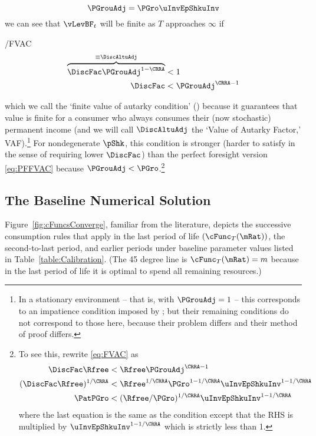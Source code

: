 \documentclass[BufferStockTheory]{subfiles}
\begin{document}
\begin{equation}
  \label{eq:PGrouAdj}
  \PGrouAdj = \PGro \uInvEpShkuInv 
\end{equation}
we can see that $\vLevBF_{t}$ will be finite 
as $T$ approaches $\infty$ if\hypertarget{FVAC}{}
\begin{verbatimwrite}{\EqDir/FVAC}
  \begin{align}
    \overbrace{\DiscFac \PGrouAdj^{1-\CRRA} }^{\equiv \DiscAltuAdj}  & < 1 \notag
    \\ \DiscFac  & < \PGrouAdj^{\CRRA-1} \label{eq:FVAC}
  \end{align}
\end{verbatimwrite}

which we call the `finite value of autarky condition' \hypertarget{FVAC}{}
(\FVAC) because it guarantees that value is finite for a consumer who always consumes their 
(now stochastic) permanent income (and we will call $\DiscAltuAdj$ the `Value of Autarky Factor,' VAF).\footnote{In a stationary environment -- that is, with $\PGrouAdj=1$ -- this corresponds to an impatience condition imposed by \cite{mstIncFluct}; but their remaining conditions do not correspond to those here, because their problem differs and their method of proof differs.}  For nondegenerate $\pShk$, this 
condition is stronger
(harder to satisfy in the sense of requiring lower $\DiscFac$) than
the perfect foresight version \eqref{eq:PFFVAC} because $\PGrouAdj <
\PGro$.\footnote{To see this, rewrite \eqref{eq:FVAC} as 
  \begin{align*}
    \DiscFac \Rfree & < \Rfree \PGrouAdj^{\CRRA-1}
    \\ (\DiscFac \Rfree)^{1/\CRRA}  & < \Rfree^{1/\CRRA} \PGro^{1-1/\CRRA} \uInvEpShkuInv^{1-1/\CRRA} 
    \\ \PatPGro & < (\Rfree/\PGro)^{1/\CRRA} \uInvEpShkuInv^{1-1/\CRRA}
  \end{align*}
  where the last equation is the same as the {\PFFVAC} condition except that the 
  RHS is multiplied by $\uInvEpShkuInv^{1-1/\CRRA}$ which is strictly less than 1.}


\hypertarget{Baseline-Numerical-Solution}{}
\subsection{The Baseline Numerical Solution}

Figure~\ref{fig:cFuncsConverge}, familiar from the literature, depicts the successive consumption
rules that apply in the last period of life $(\cFunc_{T}(\mRat))$, the
second-to-last period, and earlier periods under baseline parameter values listed in Table~\ref{table:Calibration}.  (The 45 degree line is $\cFunc_{T}(\mRat) = m$ because in
the last period of life it is optimal to spend all remaining
resources.)
\end{document}
